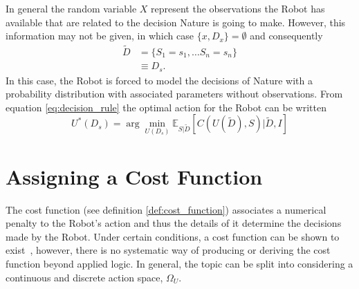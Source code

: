 \begin{example}
	In general the random variable $X$ represent the observations the Robot has available that are related to the decision Nature is going to make. However, this information may not be given, in which case $\{x,D_x\}=\emptyset$ and consequently
	\begin{equation}
		\begin{split}
			\tilde{D} &= \{S_1 =s_1,\dots S_n=s_n\}\\
			&\equiv D_s.
		\end{split}
	\end{equation}
	In this case, the Robot is forced to model the decisions of Nature with a probability distribution with associated parameters without observations. From equation \eqref{eq:decision_rule} the optimal action for the Robot can be written
	\begin{equation}
		U^*(D_s) = \arg\min_{U(D_s)} \mathbb{E}_{S|\tilde{D}}[C(U(\tilde{D}), S)|\tilde{D},I]
		\label{eq:best_decision1}
	\end{equation}
\end{example}

\section{Assigning a Cost Function}
\label{sec:assing_cost}
The cost function (see definition \ref{def:cost_function}) associates a numerical penalty to the Robot's action and thus the details of it determine the decisions made by the Robot. Under certain conditions, a cost function can be shown to exist~\citep{lavalle2006planning}, however, there is no systematic way of producing or deriving the cost function beyond applied logic. In general, the topic can be split into considering a continuous and discrete action space, $\Omega_U$. 	

